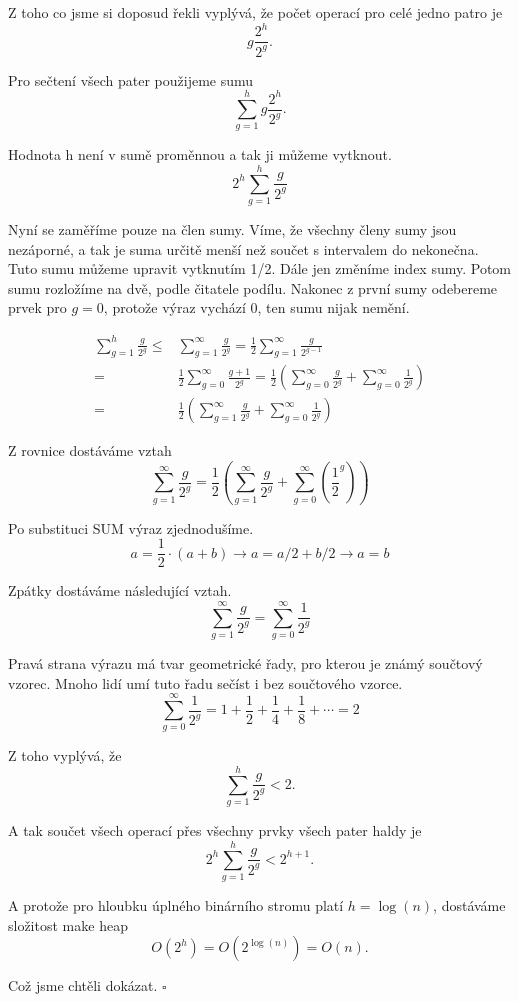 \documentclass{article}
\def\qed{\hfill$\square$}
\begin{document}
Z toho co jsme si doposud řekli vyplývá, že počet operací pro celé jedno patro je \[
    g \frac{2^h}{2^g}.
\]

Pro sečtení všech pater použijeme sumu \[
    \sum_{g=1}^h g \frac{2^h}{2^g}.
\]

Hodnota h není v sumě proměnnou a tak ji můžeme vytknout.
\[
    2^h \sum_{g=1}^h \frac{g}{2^g}
\]

Nyní se zaměříme pouze na člen sumy.
Víme, že všechny členy sumy jsou nezáporné, a tak je suma určitě menší než součet s intervalem do nekonečna.
Tuto sumu můžeme upravit vytknutím 1/2.
Dále jen změníme index sumy.
Potom sumu rozložíme na dvě, podle čitatele podílu.
Nakonec z první sumy odebereme prvek pro $g=0$, protože výraz vychází 0, ten sumu nijak nemění.

\begin{align*}
    \sum_{g=1}^h \frac{g}{2^g} \leq &\sum_{g=1}^\infty \frac{g}{2^g} = \frac{1}{2} \sum_{g=1}^\infty \frac{g}{2^{g-1}} \\
    = &\frac{1}{2} \sum_{g=0}^\infty \frac{g + 1}{2^g} = \frac{1}{2} \left(\sum_{g=0}^\infty \frac{g}{2^g} + \sum_{g=0}^\infty \frac{1}{2^g}\right) \\
    = &\frac{1}{2} \left(\sum_{g=1}^\infty \frac{g}{2^g} + \sum_{g=0}^\infty \frac{1}{2^g}\right)
\end{align*}

Z rovnice dostáváme vztah
\[
    \sum_{g=1}^\infty \frac{g}{2^g} = \frac{1}{2} \left(\sum_{g=1}^\infty \frac{g}{2^g} + \sum_{g=0}^\infty \left(\frac{1}{2}^g\right)\right)
\]

Po substituci SUM výraz zjednodušíme.
\[
    a = \frac{1}{2} \cdot (a + b) \rightarrow a = a/2 + b/2 \rightarrow a = b
\]

Zpátky dostáváme následující vztah.
\[
    \sum_{g=1}^\infty \frac{g}{2^g} = \sum_{g=0}^\infty \frac{1}{2^g}
\]

Pravá strana výrazu má tvar geometrické řady, pro kterou je známý součtový vzorec.
Mnoho lidí umí tuto řadu sečíst i bez součtového vzorce.
\[
    \sum_{g=0}^\infty \frac{1}{2^g} = 1 + \frac{1}{2} + \frac{1}{4} + \frac{1}{8} + \cdots = 2
\]

Z toho vyplývá, že \[
    \sum_{g=1}^h \frac{g}{2^g} < 2.
\]

A tak součet všech operací přes všechny prvky všech pater haldy je
\[
    2^h \sum_{g=1}^h \frac{g}{2^g} < 2^{h+1}.
\]

A protože pro hloubku úplného binárního stromu platí $h = \log(n)$, dostáváme složitost make heap
\[
    O(2^h) = O(2^{\log(n)}) = O(n).
\]

Což jsme chtěli dokázat. \qed\



\end{document}
